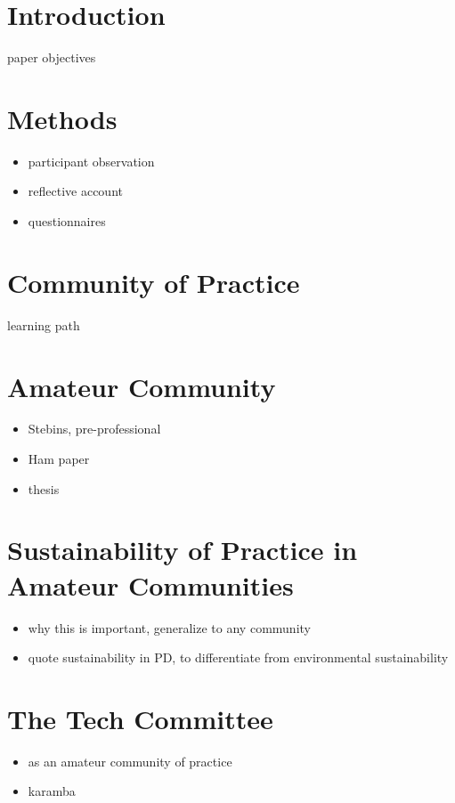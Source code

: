 \documentclass{acm_proc_article-sp}
\begin{document}

\section{Introduction}\label{sec:introduction}
\cite{bogdan03}
paper objectives

\section{Methods}\label{sec:method}
\begin{itemize}
\item participant observation
\item reflective account
\item questionnaires
\end{itemize}

\section{Community of Practice}\label{sec:cop}
learning path

\section{Amateur Community}\label{sec:amateur}
\begin{itemize}
\item Stebins, pre-professional
\item Ham paper
\item thesis
\end{itemize}

\section{Sustainability of Practice in Amateur Communities}\label{sec:sust}
\begin{itemize}
\item why this is important, generalize to any community
\item quote sustainability in PD, to differentiate from environmental sustainability
\end{itemize}

\section{The Tech Committee}\label{sec:itc}
\begin{itemize}
\item as an amateur community of practice
\item karamba
\end{itemize}
\end{document}
